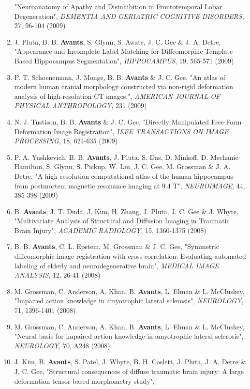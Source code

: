\documentclass[11pt]{moderncv} %
\begin{document}
\begin{enumerate}
"Neuroanatomy of Apathy and Disinhibition in Frontotemporal Lobar Degeneration", 
{\em DEMENTIA AND GERIATRIC COGNITIVE DISORDERS}, 27, 96-104 (2009)
\item J. Pluta, B. B. \textbf{Avants}, S. Glynn, S. Awate, J. C. Gee \&  J. A. Detre, 
"Appearance and Incomplete Label Matching for Diffeomorphic Template Based Hippocampus Segmentation", 
{\em HIPPOCAMPUS}, 19, 565-571 (2009)
\item P. T. Schoenemann, J. Monge, B. B. \textbf{Avants} \&  J. C. Gee, 
"An atlas of modern human cranial morpbology constructed via non-rigid deformation analysis of high-resolution CT images.", 
{\em AMERICAN JOURNAL OF PHYSICAL ANTHROPOLOGY}, 231 (2009)
\item N. J. Tustison, B. B. \textbf{Avants} \&  J. C. Gee, 
"Directly Manipulated Free-Form Deformation Image Registration", 
{\em IEEE TRANSACTIONS ON IMAGE PROCESSING}, 18, 624-635 (2009)
\item P. A. Yushkevich, B. B. \textbf{Avants}, J. Pluta, S. Das, D. Minkoff, D. Mechanic-Hamilton, S. Glynn, S. Pickup, W. Liu, J. C. Gee, M. Grossman \&  J. A. Detre, 
"A high-resolution computational atlas of the human hippocampus from postmortem magnetic resonance imaging at 9.4 T", 
{\em NEUROIMAGE}, 44, 385-398 (2009)
\item B. \textbf{Avants}, J. T. Duda, J. Kim, H. Zhang, J. Pluta, J. C. Gee \&  J. Whyte, 
"Multivariate Analysis of Structural and Diffusion Imaging in Traumatic Brain Injury", 
{\em ACADEMIC RADIOLOGY}, 15, 1360-1375 (2008)
\item B. B. \textbf{Avants}, C. L. Epstein, M. Grossman \&  J. C. Gee, 
"Symmetric diffeomorphic image registration with cross-correlation: Evaluating automated labeling of elderly and neurodegenerative brain", 
{\em MEDICAL IMAGE ANALYSIS}, 12, 26-41 (2008)
\item M. Grossman, C. Anderson, A. Khan, B. \textbf{Avants}, L. Elman \&  L. McCluskey, 
"Impaired action knowledge in amyotrophic lateral sclerosis", 
{\em NEUROLOGY}, 71, 1396-1401 (2008)
\item M. Grossman, C. Anderson, A. Khan, B. \textbf{Avants}, L. Elman \&  L. McCluskey, 
"Neural basis for impaired action knowledge in amyotrophic lateral sclerosis", 
{\em NEUROLOGY}, 70, A248 (2008)
\item J. Kim, B. \textbf{Avants}, S. Patel, J. Whyte, B. H. Coslett, J. Pluta, J. A. Detre \&  J. C. Gee, 
"Structural consequences of diffuse traumatic brain injury: A large deformation tensor-based morphometry study", 

\end{enumerate}
\end{document}
